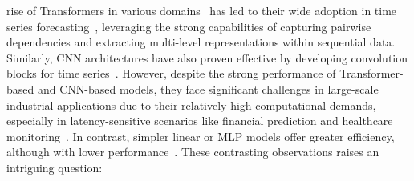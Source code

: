 rise of Transformers in various domains~\cite{DBLP:journals/corr/abs-1810-04805,khan2022transformers} has led to their wide adoption in  time series forecasting~\cite{wen2022transformers, autoformer, fedformer, informer, patchtst, itransformer}, leveraging the strong capabilities of capturing pairwise dependencies and extracting multi-level representations within sequential data.
Similarly, CNN architectures have also proven effective by developing convolution blocks for time series~\cite{moderntcn, micn}.
However, despite the strong performance of Transformer-based and CNN-based models, they face significant challenges in large-scale industrial applications due to their relatively high computational demands, especially in latency-sensitive scenarios like financial prediction and healthcare monitoring~\cite{granger2014forecasting, kaushik2020ai}. In contrast, simpler linear or MLP models offer greater efficiency, although with lower performance~\cite{dlinear, sparsetsf}. These contrasting observations raises an intriguing question:


